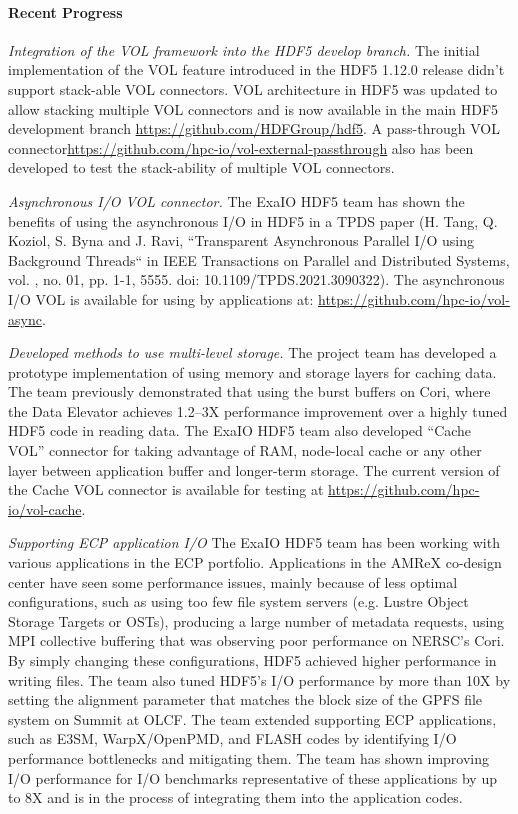\paragraph{Recent Progress}
\emph{Integration of the VOL framework into the HDF5 develop branch. } The initial implementation of the VOL feature introduced in the HDF5 1.12.0 release didn't support stack-able VOL connectors. VOL architecture in HDF5 was updated to allow stacking multiple VOL connectors and is now available in the main HDF5 development branch \url{https://github.com/HDFGroup/hdf5}. A pass-through VOL connector\url{https://github.com/hpc-io/vol-external-passthrough} also has been developed to test the stack-ability of multiple VOL connectors. 

\emph{Asynchronous I/O VOL connector. }  The ExaIO HDF5 team has shown the benefits of using the asynchronous I/O in HDF5 in a TPDS paper (H. Tang, Q. Koziol, S. Byna and J. Ravi, ``Transparent Asynchronous Parallel I/O using Background Threads`` in IEEE Transactions on Parallel and Distributed Systems, vol. , no. 01, pp. 1-1, 5555.
doi: 10.1109/TPDS.2021.3090322). The asynchronous I/O VOL is available for using by applications at: \url{https://github.com/hpc-io/vol-async}.

\emph{Developed methods to use multi-level storage.} The project team has developed a prototype implementation of using memory and storage layers for caching data. The team previously demonstrated that using the burst buffers on Cori, where the Data Elevator achieves 1.2--3X performance improvement over a highly tuned HDF5 code in reading data. The ExaIO HDF5 team also developed ``Cache VOL'' connector for taking advantage of RAM, node-local cache or any other layer between application buffer and longer-term storage. The current version of the Cache VOL connector is available for testing at \url{https://github.com/hpc-io/vol-cache}.  

\emph{Supporting ECP application I/O}
The ExaIO HDF5 team has been working with various applications in the ECP portfolio. Applications in the AMReX co-design center have seen some performance issues, mainly because of less optimal configurations, such as using too few file system servers (e.g. Lustre Object Storage Targets or OSTs), producing a large number of metadata requests, using MPI collective buffering that was observing poor performance on NERSC's Cori. By simply changing these configurations, HDF5 achieved higher performance in writing files. The team also tuned HDF5's I/O performance by more than 10X by setting the alignment parameter that matches the block size of the GPFS file system on Summit at OLCF. The team extended supporting ECP applications, such as E3SM, WarpX/OpenPMD, and FLASH codes by identifying I/O performance bottlenecks and mitigating them. The team has shown improving I/O performance for I/O benchmarks representative of these applications by up to 8X and is in the process of integrating them into the application codes.

